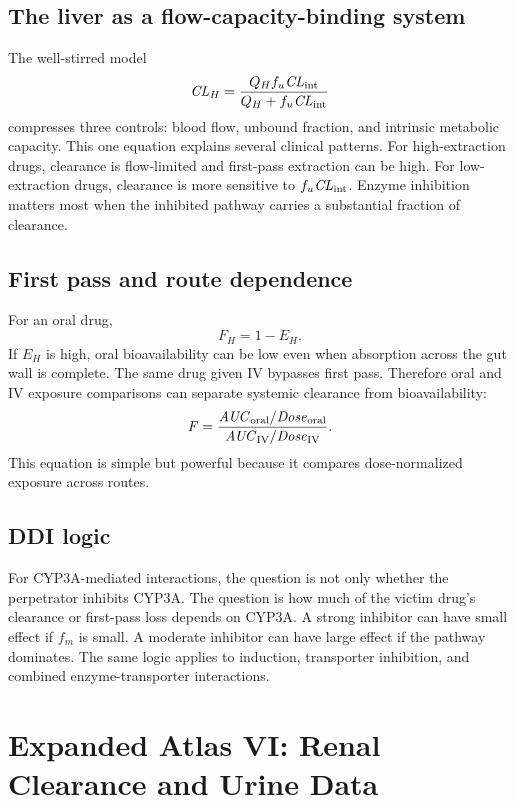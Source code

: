 \subsection{The liver as a flow-capacity-binding system}

The well-stirred model
\[
  \pkCL_H=\frac{Q_H f_u \pkCL_{\pklab{int}}}{Q_H+f_u \pkCL_{\pklab{int}}}
\]
compresses three controls: blood flow, unbound fraction, and intrinsic metabolic capacity. This one equation explains several clinical patterns. For high-extraction drugs, clearance is flow-limited and first-pass extraction can be high. For low-extraction drugs, clearance is more sensitive to \(f_u\pkCL_{\pklab{int}}\). Enzyme inhibition matters most when the inhibited pathway carries a substantial fraction of clearance.

\figureWellStirred

\subsection{First pass and route dependence}

For an oral drug,
\[
  F_H=1-E_H.
\]
If \(E_H\) is high, oral bioavailability can be low even when absorption across the gut wall is complete. The same drug given IV bypasses first pass. Therefore oral and IV exposure comparisons can separate systemic clearance from bioavailability:
\[
  \pkF
  =
  \frac{\pkAUC_{\pklab{oral}}/\pksym{Dose}_{\pklab{oral}}}
       {\pkAUC_{\pklab{IV}}/\pksym{Dose}_{\pklab{IV}}}.
\]
This equation is simple but powerful because it compares dose-normalized exposure across routes.

\subsection{DDI logic}

For CYP3A-mediated interactions, the question is not only whether the perpetrator inhibits CYP3A. The question is how much of the victim drug's clearance or first-pass loss depends on CYP3A. A strong inhibitor can have small effect if \(f_m\) is small. A moderate inhibitor can have large effect if the pathway dominates. The same logic applies to induction, transporter inhibition, and combined enzyme-transporter interactions.

\section{Expanded Atlas VI: Renal Clearance and Urine Data}

